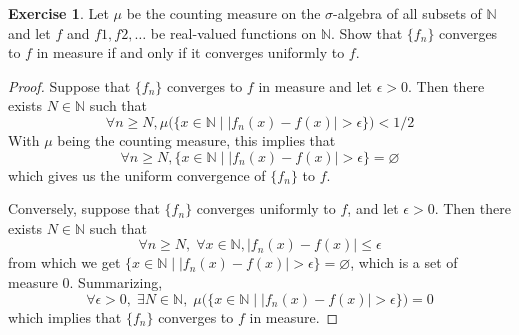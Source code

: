 \documentclass[11pt,a4paper,twoside]{article}
\theoremstyle{definition}
\newcounter{excounter}
\newtheorem{exercise}[excounter]{Exercise}
\begin{document}
\begin{exercise}
  Let $\mu$ be the counting measure on the $\sigma$-algebra of all subsets of $\mathbb{N}$ and let $f$ and $f1, f2, \ldots$ be real-valued functions on $\mathbb{N}$.
  Show that $\{ f_n \}$ converges to $f$ in measure if and only if it converges uniformly to $f$.
\end{exercise}

\begin{proof}\hfill

  Suppose that $\{ f_n \}$ converges to $f$ in measure and let $\epsilon > 0$. Then there exists $N \in \mathbb{N}$ such that
  \[
  \forall n \geq N, \mu \big( \{ x \in \mathbb{N} \mid | f_n (x) - f (x) | > \epsilon \} \big) < 1 / 2
  \]
  With $\mu$ being the counting measure, this implies that
  \[
  \forall n \geq N, \{ x \in \mathbb{N} \mid | f_n (x) - f (x) | > \epsilon \} = \varnothing
  \]
  which gives us the uniform convergence of $\{ f_n \}$ to $f$.


  Conversely, suppose that $\{ f_n \}$ converges uniformly to $f$, and let $\epsilon > 0$. Then there exists $N \in \mathbb{N}$ such that
  \[
  \forall n \geq N,\; \forall x \in \mathbb{N}, | f_n (x) - f (x) | \leq \epsilon
  \]
  from which we get $\{ x \in \mathbb{N} \mid | f_n (x) - f(x) | > \epsilon \} = \varnothing$,
  which is a set of measure $0$. Summarizing,
  \[
  \forall \epsilon > 0,\; \exists N \in \mathbb{N},\; \mu \big(\{ x \in \mathbb{N} \mid | f_n (x) - f (x) | > \epsilon \} \big) = 0
  \]
  which implies that $\{ f_n \}$ converges to $f$ in measure.

\end{proof}
\end{document}
